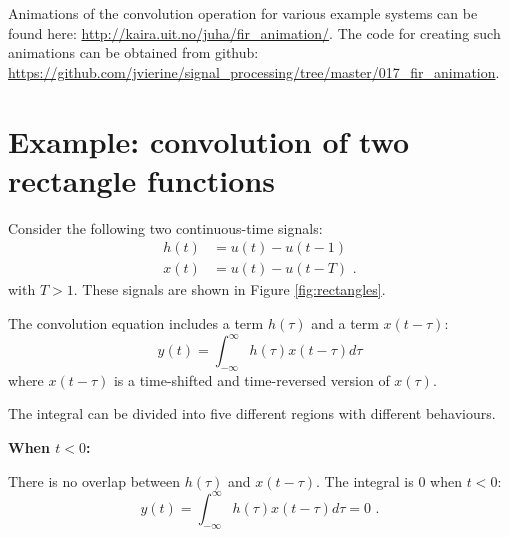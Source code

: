 Animations of the convolution operation for various example systems
can be found here: \url{http://kaira.uit.no/juha/fir_animation/}. The
code for creating such animations can be obtained from github:
\url{https://github.com/jvierine/signal_processing/tree/master/017_fir_animation}.



\section{Example: convolution of two rectangle functions}




Consider the following two continuous-time signals:
\begin{align}
h(t) &= u(t)-u(t-1) \\
x(t) &= u(t)-u(t-T)\,\,.
\end{align}
with $T>1$. These signals are shown in Figure \ref{fig:rectangles}.

The convolution equation includes a term $h(\tau)$ and a term $x(t-\tau)$:
\begin{equation}
y(t)=\int_{-\infty}^{\infty}h(\tau)x(t-\tau)d\tau
\end{equation}
where $x(t-\tau)$ is a time-shifted and time-reversed version of
$x(\tau)$.

The integral can be divided into five different regions with different behaviours.

\noindent \textbf{When $t<0$:}

There is no overlap between $h(\tau)$ and $x(t-\tau)$. The integral is $0$ when $t<0$:
\begin{equation}
y(t) = \int_{-\infty}^{\infty} h(\tau)x(t-\tau)d\tau = 0\,\,.
\end{equation}

